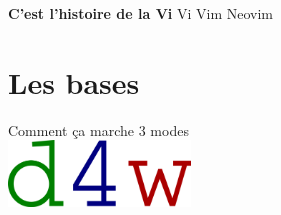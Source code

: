 \documentclass[10pt]{beamer}
\begin{document}
\begin{frame}{\textbf{C'est l'histoire de la Vi}}
	Vi \rightarrow Vim \rightarrow Neovim\\
	\vspace{20pt}

	\hspace{10pt}

\end{frame}

\section{Les bases}
	\begin{frame}{Comment ça marche}
		\center
		\huge 3 modes\\
		\vspace{20pt}
		\includegraphics[height=50pt]{img/example.png}
	\end{frame}
\end{document}
